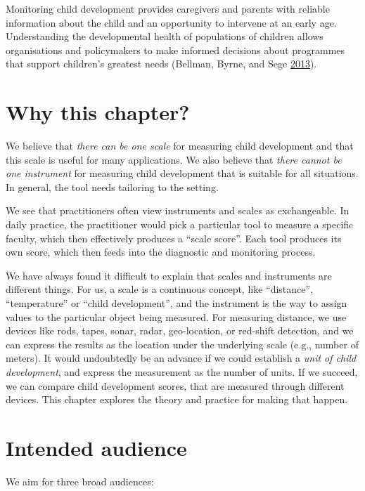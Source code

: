 \documentclass[
]{book}
\begin{document}
Monitoring child development provides caregivers and parents with reliable information about the child and an opportunity to intervene at an early age. Understanding the developmental health of populations of children allows organisations and policymakers to make informed decisions about programmes that support children's greatest needs (Bellman, Byrne, and Sege \protect\hyperlink{ref-bellman2013}{2013}).

\hypertarget{sec:why}{%
\section{Why this chapter?}\label{sec:why}}

We believe that \emph{there can be one scale} for measuring child development and that this scale is useful for many applications. We also believe that \emph{there cannot be one instrument} for measuring child development that is suitable for all situations. In general, the tool needs tailoring to the setting.

We see that practitioners often view instruments and scales as exchangeable. In daily practice, the practitioner would pick a particular tool to measure a specific faculty, which then effectively produces a ``scale score''. Each tool produces its own score, which then feeds into the diagnostic and monitoring process.

We have always found it difficult to explain that scales and instruments are different things. For us, a scale is a continuous concept, like ``distance'', ``temperature'' or ``child development'', and the instrument is the way to assign values to the particular object being measured. For measuring distance, we use devices like rods, tapes, sonar, radar, geo-location, or red-shift detection, and we can express the results as the location under the underlying scale (e.g., number of meters). It would undoubtedly be an advance if we could establish a \emph{unit of child development}, and express the measurement as the number of units. If we succeed, we can compare child development scores, that are measured through different devices. This chapter explores the theory and practice for making that happen.

\hypertarget{sec:audience}{%
\section{Intended audience}\label{sec:audience}}

We aim for three broad audiences:
\end{document}
